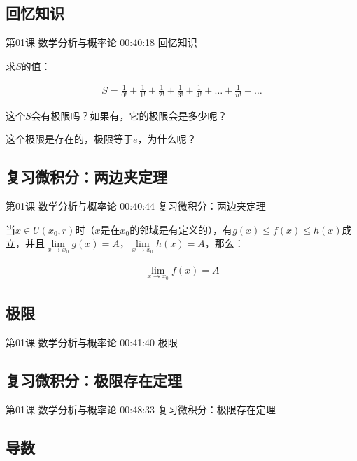 \documentclass[UTF8]{ctexart}
\begin{document}
\subsection{回忆知识}

第01课 数学分析与概率论 00:40:18 回忆知识

求$S$的值：

\begin{equation}
\begin{aligned}
S=\frac{1}{0!}+\frac{1}{1!}+\frac{1}{2!}+\frac{1}{3!}+\frac{1}{4!}+\dots+\frac{1}{n!}+\dots
\end{aligned}
\end{equation}

这个$S$会有极限吗？如果有，它的极限会是多少呢？

这个极限是存在的，极限等于$e$，为什么呢？

\subsection{复习微积分：两边夹定理}

第01课 数学分析与概率论 00:40:44 复习微积分：两边夹定理

当$x \in U(x_{0},r)$时（$x$是在$x_{0}$的邻域是有定义的），有$g(x) \leq f(x) \leq h(x)$成立，并且$\underset{x \rightarrow x_{0}}{\lim}g(x)=A$，$\underset{x \rightarrow x_{0}}{\lim}h(x)=A$，那么：

\begin{equation}
\begin{aligned}
\underset{x \rightarrow x_{0}}{\lim}f(x)=A
\end{aligned}
\end{equation}

\subsection{极限}

第01课 数学分析与概率论 00:41:40 极限

\subsection{复习微积分：极限存在定理}

第01课 数学分析与概率论 00:48:33 复习微积分：极限存在定理

\subsection{导数}
\end{document}
